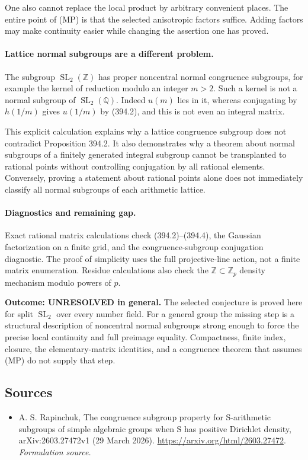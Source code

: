 \documentclass[11pt]{article}
\begin{document}
One also cannot replace the local product by arbitrary convenient
places. The entire point of (MP) is that the selected anisotropic
factors suffice. Adding factors may make continuity easier while
changing the assertion one has proved.

\paragraph{Lattice normal subgroups are a different problem.}
The subgroup $\operatorname{SL}_2(\mathbb Z)$ has proper noncentral
normal congruence subgroups, for example the kernel of reduction modulo
an integer $m>2$. Such a kernel is not a normal subgroup of
$\operatorname{SL}_2(\mathbb Q)$. Indeed
$u(m)$ lies in it, whereas conjugating by $h(1/m)$ gives $u(1/m)$
by (394.2), and this is not even an integral matrix.

This explicit calculation explains why a lattice congruence subgroup
does not contradict Proposition 394.2. It also demonstrates why a theorem
about normal subgroups of a finitely generated integral subgroup cannot
be transplanted to rational points without controlling conjugation by
all rational elements. Conversely, proving a statement about rational
points alone does not immediately classify all normal subgroups of
each arithmetic lattice.

\paragraph{Diagnostics and remaining gap.}
Exact rational matrix calculations check (394.2)--(394.4), the Gaussian
factorization on a finite grid, and the congruence-subgroup conjugation
diagnostic. The proof of simplicity uses the full projective-line action,
not a finite matrix enumeration. Residue calculations also check the
$\mathbb Z\subset\mathbb Z_p$ density mechanism modulo powers of $p$.

\textbf{Outcome: UNRESOLVED in general.} The selected conjecture is
proved here for split $\operatorname{SL}_2$ over every number field.
For a general group the missing step is a structural description of
noncentral normal subgroups strong enough to force the precise local
continuity and full preimage equality. Compactness, finite index,
closure, the elementary-matrix identities, and a congruence theorem
that assumes (MP) do not supply that step.

\subsection{Sources}
\begin{itemize}
\item[S1]A. S. Rapinchuk, The congruence subgroup property for S-arithmetic subgroups of simple algebraic groups when S has positive Dirichlet density, arXiv:2603.27472v1 (29 March 2026).
\url{https://arxiv.org/html/2603.27472}.
\textit{Formulation source.}
\end{itemize}
\end{document}
